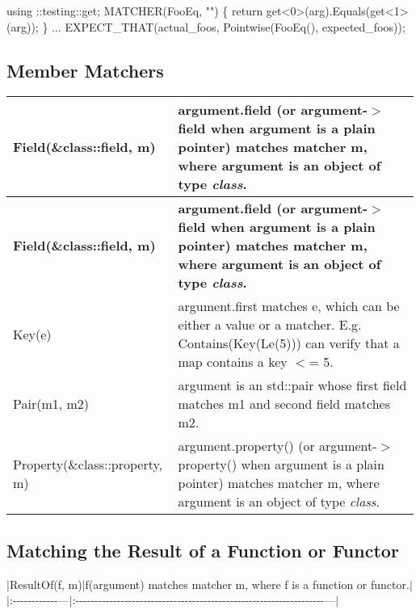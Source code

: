 \begin{DoxyCode}
using ::testing::get;
MATCHER(FooEq, "") \{
  return get<0>(arg).Equals(get<1>(arg));
\}
...
EXPECT\_THAT(actual\_foos, Pointwise(FooEq(), expected\_foos));
\end{DoxyCode}


\subsection*{Member Matchers}

\tabulinesep=1mm
\begin{longtabu} spread 0pt [c]{*{2}{|X[-1]}|}
\hline
\rowcolor{\tableheadbgcolor}\textbf{ {\ttfamily Field(\&class\+::field, m)}}&\textbf{ {\ttfamily argument.\+field} (or {\ttfamily argument-\/$>$field} when {\ttfamily argument} is a plain pointer) matches matcher {\ttfamily m}, where {\ttfamily argument} is an object of type {\itshape class}.  }\\
\endfirsthead
\hline
\endfoot
\hline
\rowcolor{\tableheadbgcolor}\textbf{ {\ttfamily Field(\&class\+::field, m)}}&\textbf{ {\ttfamily argument.\+field} (or {\ttfamily argument-\/$>$field} when {\ttfamily argument} is a plain pointer) matches matcher {\ttfamily m}, where {\ttfamily argument} is an object of type {\itshape class}.  }\\
\endhead
{\ttfamily Key(e)} &{\ttfamily argument.\+first} matches {\ttfamily e}, which can be either a value or a matcher. E.\+g. {\ttfamily Contains(Key(\+Le(5)))} can verify that a {\ttfamily map} contains a key {\ttfamily $<$= 5}. \\
{\ttfamily Pair(m1, m2)} &{\ttfamily argument} is an {\ttfamily std\+::pair} whose {\ttfamily first} field matches {\ttfamily m1} and {\ttfamily second} field matches {\ttfamily m2}. \\
{\ttfamily Property(\&class\+::property, m)}&{\ttfamily argument.\+property()} (or {\ttfamily argument-\/$>$property()} when {\ttfamily argument} is a plain pointer) matches matcher {\ttfamily m}, where {\ttfamily argument} is an object of type {\itshape class}. \\
\end{longtabu}
\subsection*{Matching the Result of a Function or Functor}

$\vert${\ttfamily Result\+Of(f, m)}$\vert${\ttfamily f(argument)} matches matcher {\ttfamily m}, where {\ttfamily f} is a function or functor.$\vert$ $\vert$\+:-\/-\/-\/-\/-\/-\/-\/-\/-\/-\/-\/-\/---$\vert$\+:-\/-\/-\/-\/-\/-\/-\/-\/-\/-\/-\/-\/-\/-\/-\/-\/-\/-\/-\/-\/-\/-\/-\/-\/-\/-\/-\/-\/-\/-\/-\/-\/-\/-\/-\/-\/-\/-\/-\/-\/-\/-\/-\/-\/-\/-\/-\/-\/-\/-\/-\/-\/-\/-\/-\/-\/-\/-\/-\/-\/-\/-\/-\/-\/-\/-\/---$\vert$

